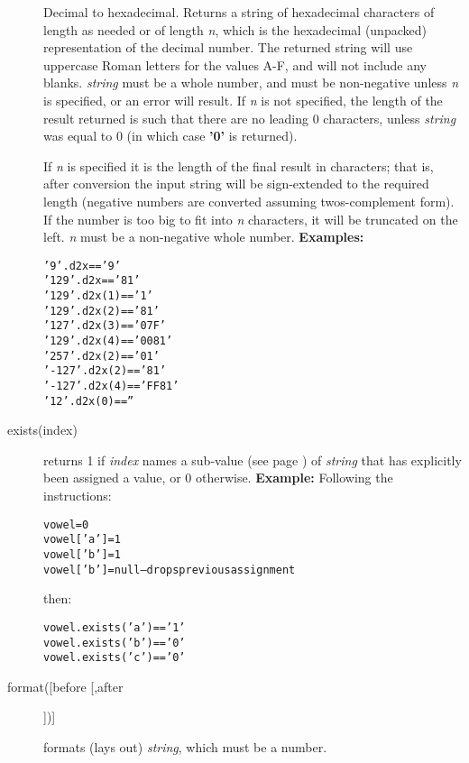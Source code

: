 \begin{description}
Decimal to hexadecimal.
Returns a string of hexadecimal characters of length as needed or of
length \emph{n}, which is the hexadecimal (unpacked) representation
of the decimal number.  The returned string will use uppercase
Roman letters for the values A-F, and will not include any blanks.
 \emph{string} must be a whole number, and must be non-negative
unless \emph{n} is specified, or an error will result.
If \emph{n} is not specified, the length of the result returned is
such that there are no leading 0 characters, unless \emph{string}
was equal to 0 (in which case \textbf{'0'} is returned).
 
If \emph{n} is specified it is the length of the final result in
characters; that is, after conversion the input string will be
sign-extended to the required length (negative numbers are converted
assuming twos-complement form).
If the number is too big to fit into \emph{n} characters, it will be
truncated on the left.
\emph{n} must be a non-negative whole number.
 \textbf{Examples:}
\begin{alltt}
'9'.d2x       == '9'
'129'.d2x     == '81'
'129'.d2x(1)  == '1'
'129'.d2x(2)  == '81'
'127'.d2x(3)  == '07F'
'129'.d2x(4)  == '0081'
'257'.d2x(2)  == '01'
'-127'.d2x(2) == '81'
'-127'.d2x(4) == 'FF81'
'12'.d2x(0)   == ''
\end{alltt}
\item[exists(index)]\label{refexists}

returns 1 if \emph{index} names a  sub-value (see page \pageref{refinstr})  of
\emph{string} that has explicitly been assigned a value, or 0
otherwise.
 \textbf{Example:}
 Following the instructions:
\begin{alltt}
vowel=0
vowel['a']=1
vowel['b']=1
vowel['b']=null -- drops previous assignment
\end{alltt}
then:
\begin{alltt}
vowel.exists('a') == '1'
vowel.exists('b') == '0'
vowel.exists('c') == '0'
\end{alltt}
\item[format([before [,after]])]\label{refformat}

formats (lays out) \emph{string}, which must be a number.
 

\end{description}
